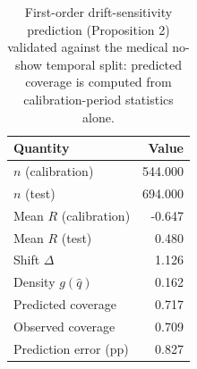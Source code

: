 \begin{table}[htbp]
\centering
\caption{First-order drift-sensitivity prediction (Proposition 2) validated against the medical no-show temporal split: predicted coverage is computed from calibration-period statistics alone.}
\label{tab:theory-validation}
\begin{tabular}{lr}
\toprule
Quantity & Value \\
\midrule
$n$ (calibration) & 544.000 \\
$n$ (test) & 694.000 \\
Mean $R$ (calibration) & -0.647 \\
Mean $R$ (test) & 0.480 \\
Shift $\Delta$ & 1.126 \\
Density $g(\hat q)$ & 0.162 \\
Predicted coverage & 0.717 \\
Observed coverage & 0.709 \\
Prediction error (pp) & 0.827 \\
\bottomrule
\end{tabular}
\end{table}
